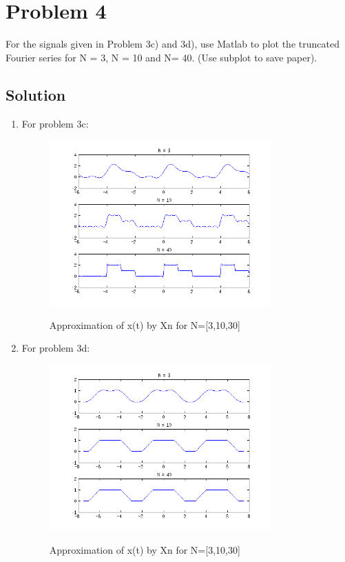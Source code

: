 \section*{Problem 4}
For the signals given in Problem 3c) and 3d), use Matlab to plot the truncated 
Fourier series for N = 3, N = 10 and N= 40. (Use subplot to save paper).

\subsection*{Solution}
\begin{enumerate}
\item For problem 3c:

\begin{figure}[H]
\caption{Approximation of x(t) by Xn for N=[3,10,30]}
\centering
\includegraphics[width=0.8\textwidth]{figs/c1p4.png}
\label{fig:c1p4}
\end{figure} 

\item For problem 3d:

\begin{figure}[H]
\caption{Approximation of x(t) by Xn for N=[3,10,30]}
\centering
\includegraphics[width=0.8\textwidth]{figs/c1p4b.png}
\label{fig:c1p4}
\end{figure} 


\end{enumerate} 
